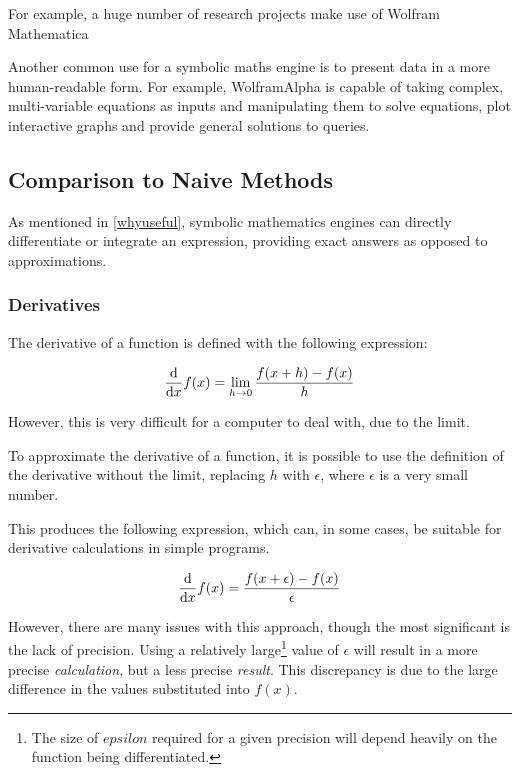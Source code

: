 \documentclass[12pt]{article}
\def\Wolf{{{\color{red}Wolfram\color{orange}Alpha}}}
\begin{document}
For example, a huge number of research projects make use of Wolfram Mathematica\cite{mathematica}

Another common use for a symbolic maths engine is to present data in a more human-readable form. For example, \Wolf{} is capable of taking complex, multi-variable equations as inputs and manipulating them to solve equations, plot interactive graphs and provide general solutions to queries.

\subsection{Comparison to Naive Methods}

As mentioned in \ref{whyuseful}, symbolic mathematics engines can directly differentiate or integrate an expression, providing exact answers as opposed to approximations.

\subsubsection{Derivatives}

The derivative of a function is defined with the following expression:

\begin{equation}
\dv{x} f(x) = \lim_{h \rightarrow 0}{\frac{f(x+h)-f(x)}{h}}
\end{equation}

However, this is very difficult for a computer to deal with, due to the limit.

To approximate the derivative of a function, it is possible to use the definition of the derivative without the limit, replacing $h$ with $\epsilon$, where $\epsilon$ is a very small number.

This produces the following expression, which can, in some cases, be suitable for derivative calculations in simple programs.

\begin{equation}
\dv{x} f(x) = \frac{f(x + \epsilon) - f(x)}{\epsilon}
\end{equation}

However, there are many issues with this approach, though the most significant is the lack of precision. Using a relatively large\footnote{The size of $epsilon$ required for a given precision will depend heavily on the function being differentiated.} value of $\epsilon$ will result in a more precise \textit{calculation}, but a less precise \textit{result}. This discrepancy is due to the large difference in the values substituted into $f(x)$.
	
\end{document}

